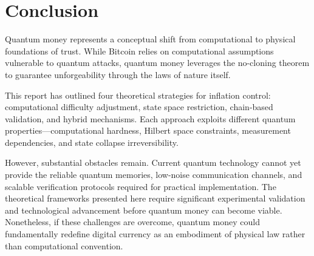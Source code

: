 \documentclass[a4paper,10.5pt,twoside]{article}
\begin{document}
\section{Conclusion}\label{s:4}
Quantum money represents a conceptual shift from computational to physical foundations of trust. While Bitcoin relies on computational assumptions vulnerable to quantum attacks, quantum money leverages the no-cloning theorem to guarantee unforgeability through the laws of nature itself.

This report has outlined four theoretical strategies for inflation control: computational difficulty adjustment, state space restriction, chain-based validation, and hybrid mechanisms. Each approach exploits different quantum properties—computational hardness, Hilbert space constraints, measurement dependencies, and state collapse irreversibility.

However, substantial obstacles remain. Current quantum technology cannot yet provide the reliable quantum memories, low-noise communication channels, and scalable verification protocols required for practical implementation. The theoretical frameworks presented here require significant experimental validation and technological advancement before quantum money can become viable. Nonetheless, if these challenges are overcome, quantum money could fundamentally redefine digital currency as an embodiment of physical law rather than computational convention.

\printbibliography
\end{document}
